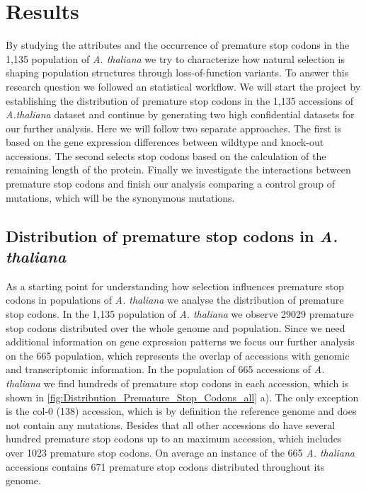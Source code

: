 \chapter{Results}
By studying the attributes and the occurrence of premature stop codons in the 1,135 population of \textit{A. thaliana} we try to characterize how natural selection is shaping population structures through loss-of-function variants. To answer this research question we followed an statistical workflow. We will start the project by establishing the distribution of premature stop codons in the 1,135 accessions of \textit{A.thaliana} dataset and continue by generating two high confidential datasets for our further analysis. Here we will follow two separate approaches. The first is based on the gene expression differences between wildtype and knock-out accessions. The second selects stop codons based on the calculation of the remaining length of the protein. Finally we  investigate the interactions between premature stop codons and finish our analysis comparing a control group of mutations, which will be the synonymous mutations. 
\section{Distribution of premature stop codons in \textit{A. thaliana}}
\label{sec:Distribution_Results}
As a starting point for understanding how selection influences premature stop codons in populations of \textit{A. thaliana} we analyse the distribution of premature stop codons. In the 1,135 population of \textit{A. thaliana} we observe 29029 premature stop codons distributed over the whole genome and population. Since we need additional information on gene expression patterns we focus our further analysis on the 665 population, which represents the overlap of accessions with genomic and transcriptomic information. In the population of 665 accessions of \textit{A. thaliana} we find hundreds of premature stop codons in each accession, which is shown in \autoref{fig:Distribution_Premature_Stop_Codons_all} a). The only exception is the col-0 (138) accession, which is by definition the reference genome and does not contain any mutations. Besides that all other accessions do have several hundred premature stop codons up to an maximum accession, which includes over 1023 premature stop codons. On average an instance of the 665 \textit{A. thaliana} accessions contains 671 premature stop codons distributed throughout its genome.

